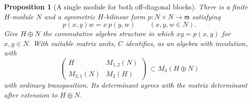 \documentclass[a4paper,11pt]{article}
\newtheorem{proposition}{Proposition}[section]
\theoremstyle{definition}
\theoremstyle{remark}
\numberwithin{equation}{section}
\begin{document}
\begin{proposition}[A single module for both off-diagonal blocks]\leavevmode
\label{prop:orthogonalblocks410}
There is a finite \(H\)-module \(N\) and a symmetric
\(H\)-bilinear form \(p:N\times N\to\mathfrak m\) satisfying
\[
                p(x,y)w=x\,p(y,w) \qquad (x,y,w\in N).
\]
Give \(H\oplus N\) the commutative algebra structure in which
\(x y=p(x,y)\) for \(x,y\in N\). With suitable matrix units,
\(C\) identifies, as an algebra with involution, with
\[
      \begin{pmatrix}
         H & M_{1,2}(N)\\
         M_{2,1}(N) & M_2(H)
      \end{pmatrix}\ \subset M_3(H\oplus N)
\]
with ordinary transposition. Its determinant agrees with
the matrix determinant after extension to \(H\oplus N\).
\end{proposition}
\end{document}
